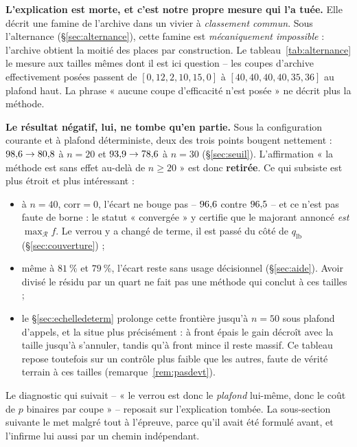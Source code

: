 \documentclass[11pt,a4paper]{article}
\theoremstyle{plain}
\theoremstyle{remark}
\newcommand{\Rcal}{\mathcal{R}}
\begin{document}
\textbf{L'explication est morte, et c'est notre propre mesure qui l'a tuée.}
Elle décrit une famine de l'archive dans un vivier à \emph{classement
commun}. Sous l'alternance (\S\ref{sec:alternance}), cette famine est
\emph{mécaniquement impossible} : l'archive obtient la moitié des places par
construction. Le tableau~\ref{tab:alternance} le mesure aux tailles mêmes
dont il est ici question -- les coupes d'archive effectivement posées
passent de $[0,12,2,10,15,0]$ à $[40,40,40,40,35,36]$ au plafond haut. La
phrase « aucune coupe d'efficacité n'est posée » ne décrit plus la méthode.

\textbf{Le résultat négatif, lui, ne tombe qu'en partie.} Sous la
configuration courante et à plafond déterministe, deux des trois points
bougent nettement : $98{,}6{}\to 80{,}8{}$ à $n=20$ et $93{,}9{}\to 78{,}6{}$ à
$n=30$ (§\ref{sec:seuil}). L'affirmation « la méthode est sans effet
au-delà de $n\ge 20$ » est donc \textbf{retirée}. Ce qui subsiste est plus
étroit et plus intéressant :

\begin{itemize}[leftmargin=*,itemsep=2pt]
\item à $n=40$, $\text{corr}=0$, l'écart ne bouge pas -- $96{,}6{}$ contre
      $96{,}5{}$ -- et ce n'est pas faute de borne : le statut « convergée »
      y certifie que le majorant annoncé \emph{est} $\max_{\Rcal}f$. Le
      verrou y a changé de terme, il est passé du côté de
      $q_{\text{lb}}$ (§\ref{sec:couverture}) ;
\item même à $81\ \%$ et $79\ \%$, l'écart reste sans usage décisionnel
      (§\ref{sec:aide}). Avoir divisé le résidu par un quart ne fait pas
      une méthode qui conclut à ces tailles ;
\item le §\ref{sec:echelledeterm} prolonge cette frontière jusqu'à $n=50$
      sous plafond d'appels, et la situe plus précisément : à front épais le
      gain décroît avec la taille jusqu'à s'annuler, tandis qu'à front mince
      il reste massif. Ce tableau repose toutefois sur un contrôle plus
      faible que les autres, faute de vérité terrain à ces tailles
      (remarque~\ref{rem:pasdevt}).
\end{itemize}

\noindent
Le diagnostic qui suivait -- « le verrou est donc le \emph{plafond}
lui-même, donc le coût de $p$ binaires par coupe » -- reposait sur
l'explication tombée. La sous-section suivante le met malgré tout à
l'épreuve, parce qu'il avait été formulé avant, et l'infirme lui aussi par
un chemin indépendant.
\end{document}
